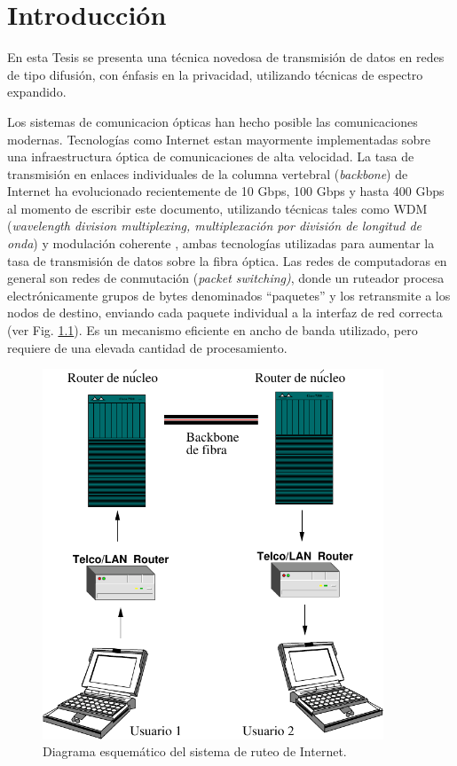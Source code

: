 \chapter{Introducción}

En esta Tesis se presenta una técnica novedosa de transmisión de datos en redes de tipo difusión, con énfasis en la privacidad, utilizando técnicas de espectro expandido.

Los sistemas de comunicacion ópticas han hecho posible las comunicaciones modernas. Tecnologías como Internet estan mayormente implementadas sobre una infraestructura óptica de comunicaciones de alta velocidad. 
La tasa de transmisión en enlaces individuales de la columna vertebral (\textit{backbone}) de Internet ha evolucionado recientemente de 10 Gbps, 100 Gbps y hasta 400 Gbps \cite{backbone} al momento de escribir este documento, utilizando técnicas tales como WDM (\textit{wavelength division multiplexing, multiplexación por división de longitud de onda}) y modulación coherente \cite{shieh2008coherent}, ambas tecnologías utilizadas para aumentar la tasa de transmisión de datos sobre la fibra óptica. 
Las redes de computadoras en general son redes de conmutación (\textit{packet switching)}, donde un ruteador procesa electrónicamente grupos de bytes denominados ``paquetes'' y los retransmite a los nodos de destino, enviando cada paquete individual a la interfaz de red correcta (ver Fig. \ref{arch:simp}). Es un mecanismo eficiente en ancho de banda utilizado, pero requiere de una elevada cantidad de procesamiento.

\begin{figure}[!t]
  \centering
    \includegraphics[width=4.0in]{graphs/internet.pdf}
    \caption{Diagrama esquemático del sistema de ruteo de Internet.}
    \label{arch:simp}
\end{figure}


